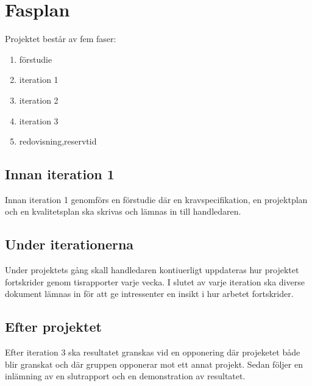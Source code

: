 \section{Fasplan}
Projektet består av fem faser:
\begin{enumerate}
\item förstudie
\item iteration 1
\item iteration 2
\item iteration 3
\item redovisning,reservtid
\end{enumerate}

\subsection{Innan iteration 1}
Innan iteration 1 genomförs en förstudie där en  kravspecifikation, en projektplan och en kvalitetsplan ska skrivas och lämnas in till handledaren. 

\subsection{Under iterationerna}
Under projektets gång skall handledaren kontiuerligt uppdateras hur projektet fortskrider genom tisrapporter varje vecka. I slutet av varje iteration ska diverse dokument lämnas in för att ge intressenter en insikt i hur arbetet fortskrider. 

\subsection{Efter projektet}
Efter iteration 3 ska resultatet granskas vid en opponering där projeketet både blir granskat och där gruppen opponerar mot ett annat projekt. Sedan följer en inlämning av en slutrapport och en demonstration av resultatet. 